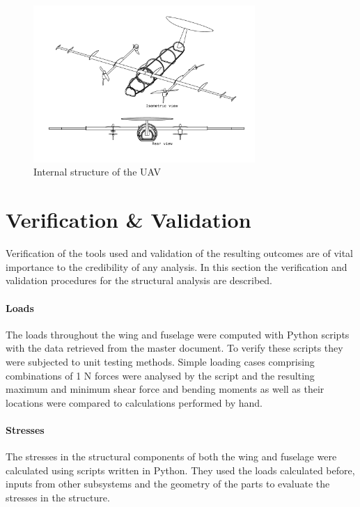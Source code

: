 \begin{figure}[H]
    \centering
    \includegraphics[width=0.75\textwidth]{Structures/Figures/Structure_iso}
    \caption{Internal structure of the UAV}
    \label{fig:complete_structure}
\end{figure}







\section{Verification \& Validation}
\label{sec:veri_vali}
Verification of the tools used and validation of the resulting outcomes are of vital importance to the credibility of any analysis. In this section the verification and validation procedures for the structural analysis are described.

\paragraph{Loads}
The loads throughout the wing and fuselage were computed with Python scripts with the data retrieved from the master document. To verify these scripts they were subjected to unit testing methods. Simple loading cases comprising combinations of 1 N forces were analysed by the script and the resulting maximum and minimum shear force and bending moments as well as their locations were compared to calculations performed by hand. 

\paragraph{Stresses}
The stresses in the structural components of both the wing and fuselage were calculated using scripts written in Python. They used the loads calculated before, inputs from other subsystems and the geometry of the parts to evaluate the stresses in the structure.

